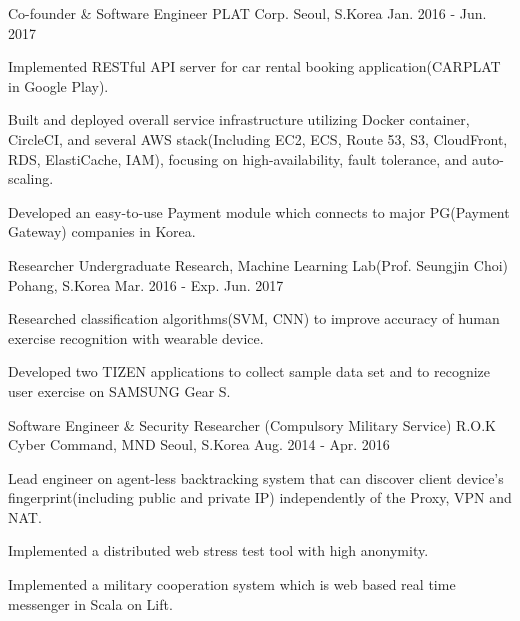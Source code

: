 \begin{cventries}
  \cventry
    {Co-founder \& Software Engineer} %
    {PLAT Corp.} %
    {Seoul, S.Korea} %
    {Jan. 2016 - Jun. 2017} %
    {
      \begin{cvitems} %
        \item {Implemented RESTful API server for car rental booking application(CARPLAT in Google Play).}
        \item {Built and deployed overall service infrastructure utilizing Docker container, CircleCI, and several AWS stack(Including EC2, ECS, Route 53, S3, CloudFront, RDS, ElastiCache, IAM), focusing on high-availability, fault tolerance, and auto-scaling.}
        \item {Developed an easy-to-use Payment module which connects to major PG(Payment Gateway) companies in Korea.}
      \end{cvitems}
    }

  \cventry
    {Researcher} %
    {Undergraduate Research, Machine Learning Lab(Prof. Seungjin Choi)} %
    {Pohang, S.Korea} %
    {Mar. 2016 - Exp. Jun. 2017} %
    {
      \begin{cvitems} %
        \item {Researched classification algorithms(SVM, CNN) to improve accuracy of human exercise recognition with wearable device.}
        \item {Developed two TIZEN applications to collect sample data set and to recognize user exercise on SAMSUNG Gear S.}
      \end{cvitems}
    }

  \cventry
    {Software Engineer \& Security Researcher (Compulsory Military Service)} %
    {R.O.K Cyber Command, MND} %
    {Seoul, S.Korea} %
    {Aug. 2014 - Apr. 2016} %
    {
      \begin{cvitems} %
        \item {Lead engineer on agent-less backtracking system that can discover client device's fingerprint(including public and private IP) independently of the Proxy, VPN and NAT.}
        \item {Implemented a distributed web stress test tool with high anonymity.}
        \item {Implemented a military cooperation system which is web based real time messenger in Scala on Lift.}
      \end{cvitems}
    }


\end{cventries}
